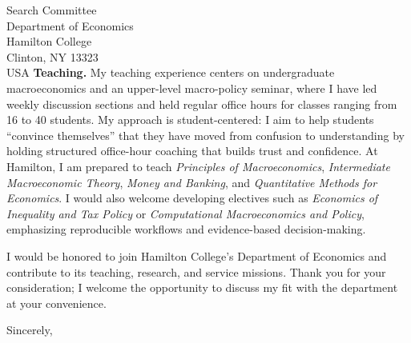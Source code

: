 \documentclass[11pt,letterpaper]{letter}
\begin{document}
\begin{letter}{Search Committee \\
Department of Economics \\
Hamilton College \\
Clinton, NY 13323 \\ USA}
\textbf{Teaching.} My teaching experience centers on undergraduate macroeconomics and an upper-level macro-policy seminar, where I have led weekly discussion sections and held regular office hours for classes ranging from 16 to 40 students. My approach is student-centered: I aim to help students “convince themselves” that they have moved from confusion to understanding by holding structured office-hour coaching that builds trust and confidence. At Hamilton, I am prepared to teach \textit{Principles of Macroeconomics}, \textit{Intermediate Macroeconomic Theory}, \textit{Money and Banking}, and \textit{Quantitative Methods for Economics}. I would also welcome developing electives such as \textit{Economics of Inequality and Tax Policy} or \textit{Computational Macroeconomics and Policy}, emphasizing reproducible workflows and evidence-based decision-making.

I would be honored to join Hamilton College’s Department of Economics and contribute to its teaching, research, and service missions. Thank you for your consideration; I welcome the opportunity to discuss my fit with the department at your convenience.

\closing{Sincerely,}

\end{letter}
\end{document}
